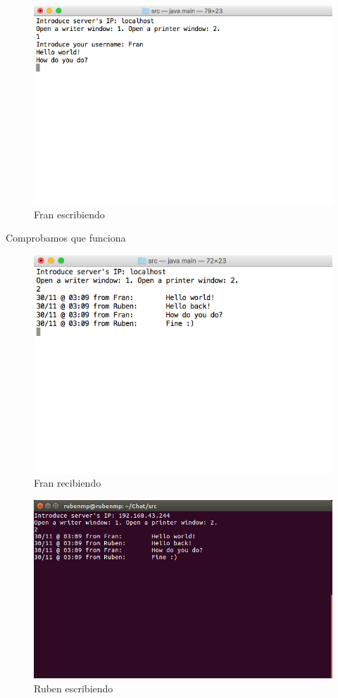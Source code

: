 \begin{figure}[H]
	\includegraphics[scale=0.65]{./Imagenes/franwriter2.png}
	\caption{Fran escribiendo}
\end{figure}

Comprobamos que funciona

\begin{figure}[H]
	\includegraphics[scale=0.65]{./Imagenes/franprinter2.png}
	\caption{Fran recibiendo}
\end{figure}

\vspace{0.1cm}

\begin{figure}[H]
	\includegraphics[scale=0.65]{./Imagenes/rubenprinter2.png}
	\caption{Ruben escribiendo}
\end{figure}


